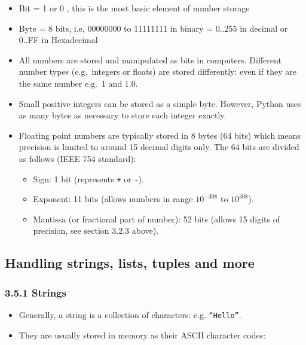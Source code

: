 \documentclass[10pt]{article}
\providecommand{\tightlist}{%
      \setlength{\itemsep}{0pt}\setlength{\parskip}{0pt}}
\begin{document}
\begin{itemize}
\tightlist
\item
  Bit = 1 or 0 , this is the most basic element of number storage
\item
  Byte = 8 bits, i.e, 00000000 to 11111111 in binary = 0..255 in decimal
  or 0..FF in Hexadecimal
\item
  All numbers are stored and manipulated as bits in computers. Different
  number types (e.g.~integers or floats) are stored differently: even if
  they are the same number e.g.~1 and 1.0.
\item
  Small positive integers can be stored as a simple byte. However,
  Python uses as many bytes as necessary to store each integer exactly.
\item
  Floating point numbers are typically stored in 8 bytes (64 bits) which
  means precision is limited to around 15 decimal digits only. The 64
  bits are divided as follows (IEEE 754 standard):

  \begin{itemize}
  \tightlist
  \item
    Sign: 1 bit (represents \texttt{+} or \texttt{-}).
  \item
    Exponent: 11 bits (allows numbers in range \(10^{-308}\) to
    \(10^{308}\)).
  \item
    Mantissa (or fractional part of number): 52 bits (allows 15 digits
    of precision, see section 3.2.3 above).
  \end{itemize}
\end{itemize}

    \hypertarget{handling-strings-lists-tuples-and-more}{%
\subsection{Handling strings, lists, tuples and
more}\label{handling-strings-lists-tuples-and-more}}

\hypertarget{strings}{%
\subsubsection*{3.5.1 Strings}\label{strings}}

\begin{itemize}
\tightlist
\item
  Generally, a string is a collection of characters: e.g.
  \texttt{“Hello”}.
\item
  They are usually stored in memory as their ASCII character codes:
\end{itemize}
\end{document}

